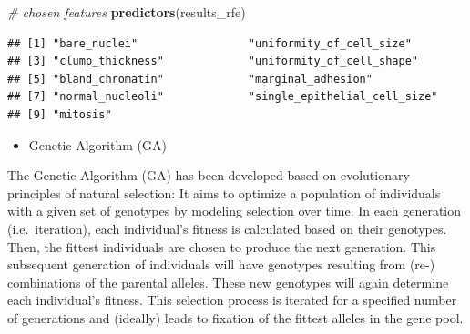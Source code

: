 \documentclass[]{article}
\newenvironment{Shaded}{\begin{snugshade}}{\end{snugshade}}
\newcommand{\KeywordTok}[1]{\textcolor[rgb]{0.13,0.29,0.53}{\textbf{{#1}}}}
\newcommand{\DataTypeTok}[1]{\textcolor[rgb]{0.13,0.29,0.53}{{#1}}}
\newcommand{\DecValTok}[1]{\textcolor[rgb]{0.00,0.00,0.81}{{#1}}}
\newcommand{\StringTok}[1]{\textcolor[rgb]{0.31,0.60,0.02}{{#1}}}
\newcommand{\CommentTok}[1]{\textcolor[rgb]{0.56,0.35,0.01}{\textit{{#1}}}}
\newcommand{\NormalTok}[1]{{#1}}
\providecommand{\tightlist}{%
  \setlength{\itemsep}{0pt}\setlength{\parskip}{0pt}}
\begin{document}
\begin{Shaded}
\end{Shaded}

\begin{Shaded}
\begin{Highlighting}[]
\CommentTok{# chosen features}
\KeywordTok{predictors}\NormalTok{(results_rfe)}
\end{Highlighting}
\end{Shaded}

\begin{verbatim}
## [1] "bare_nuclei"                 "uniformity_of_cell_size"    
## [3] "clump_thickness"             "uniformity_of_cell_shape"   
## [5] "bland_chromatin"             "marginal_adhesion"          
## [7] "normal_nucleoli"             "single_epithelial_cell_size"
## [9] "mitosis"
\end{verbatim}

\begin{Shaded}
\end{Shaded}

\begin{itemize}
\tightlist
\item
  Genetic Algorithm (GA)
\end{itemize}

The Genetic Algorithm (GA) has been developed based on evolutionary
principles of natural selection: It aims to optimize a population of
individuals with a given set of genotypes by modeling selection over
time. In each generation (i.e.~iteration), each individual's fitness is
calculated based on their genotypes. Then, the fittest individuals are
chosen to produce the next generation. This subsequent generation of
individuals will have genotypes resulting from (re-) combinations of the
parental alleles. These new genotypes will again determine each
individual's fitness. This selection process is iterated for a specified
number of generations and (ideally) leads to fixation of the fittest
alleles in the gene pool.
\end{document}

